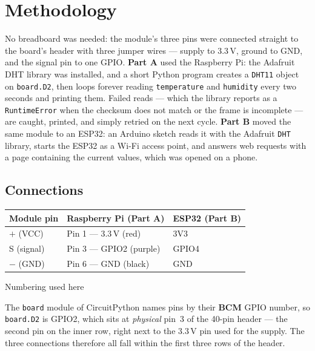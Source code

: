 \documentclass[10pt,a4paper]{article}
\begin{document}
\section{Methodology}

No breadboard was needed: the module's three pins were connected straight to the
board's header with three jumper wires --- supply to $3.3\,\mathrm{V}$, ground to GND,
and the signal pin to one GPIO. \textbf{Part A} used the Raspberry Pi: the Adafruit DHT
library was installed, and a short Python program creates a \texttt{DHT11} object on
\texttt{board.D2}, then loops forever reading \texttt{temperature} and
\texttt{humidity} every two seconds and printing them. Failed reads --- which the
library reports as a \texttt{RuntimeError} when the checksum does not match or the
frame is incomplete --- are caught, printed, and simply retried on the next cycle.
\textbf{Part B} moved the same module to an ESP32: an Arduino sketch reads it with the
Adafruit \texttt{DHT} library, starts the ESP32 as a Wi-Fi access point, and answers
web requests with a page containing the current values, which was opened on a phone.

\subsection{Connections}

\vspace{2pt}
\noindent
\begin{minipage}[t]{0.5\textwidth}
\vspace{0pt}
\begin{tabularx}{\linewidth}{@{}l >{\raggedright\arraybackslash}X >{\raggedright\arraybackslash}X@{}}
\toprule
\rowcolor{soft}
\textbf{Module pin} & \textbf{Raspberry Pi (Part A)} & \textbf{ESP32 (Part B)} \\
\midrule
$+$ (VCC)    & Pin 1 --- $3.3\,\mathrm{V}$ (red) & 3V3 \\
S (signal)   & Pin 3 --- GPIO2 (purple)          & GPIO4 \\
$-$ (GND)    & Pin 6 --- GND (black)             & GND \\
\bottomrule
\end{tabularx}
\end{minipage}\hfill
\begin{minipage}[t]{0.47\textwidth}
\vspace{0pt}
\begin{titledbox}[unbreakable]{Numbering used here}
\raggedright
The \texttt{board} module of CircuitPython names pins by their \textbf{BCM} GPIO number,
so \texttt{board.D2} is GPIO2, which sits at \emph{physical} pin~3 of the 40-pin header
--- the second pin on the inner row, right next to the $3.3\,\mathrm{V}$ pin used for
the supply. The three connections therefore all fall within the first three rows of
the header.
\end{titledbox}
\end{minipage}
\end{document}
